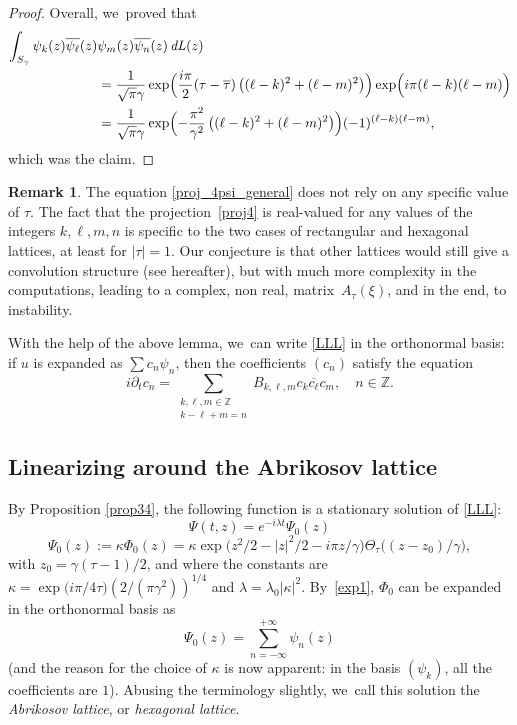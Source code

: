 \documentclass[10pt]{amsart}
\DeclareMathOperator{\dL}{\mathit{dL}}
\theoremstyle{definition}
\newtheorem{remark}[theorem]{Remark}
\let\EE\exp
\let\ov\overline
\newcommand\Z{\mathbb Z}
\newcommand{\pa}[1]{\left(#1\right)}
\begin{document}
\begin{proof}
Overall, we~proved that
\begin{align*}
\int_{S_{\gamma}} \psi_{k}(z)\ov{\psi_{\ell}}(z) &\psi_{m}(z)\ov{\psi_{n}}(z)\dL(z)\\
&= \frac{1}{\sqrt{\pi}\gamma} \EE\Bigl({ \frac{i\pi}{2}(\tau-\ov{\tau})\pa{(\ell-k)^2 + (\ell-m)^2}} \Bigr) \EE \Bigl({i\pi(\ell-k)(\ell-m)}\Bigr) \\
& = \frac{1}{\sqrt{\pi}\gamma} \EE\Bigl(-\frac{\pi^2}{\gamma^2}\pa{(\ell-k)^2 + (\ell-m)^2} \Bigr) (-1)^{(\ell-k)(\ell-m)},
\end{align*}
which was the claim.
\end{proof}

\begin{remark}\label{rk_tau_general}
The equation \eqref{proj_4psi_general} does not rely on any specific value of $\tau$. The fact that the projection~\eqref{proj4} is real-valued for any values of the integers $k, \ell, m,n$ is specific to the two cases of rectangular and hexagonal lattices, at least for $|\tau| = 1$. Our conjecture is that other lattices would still give a convolution structure (see hereafter), but with much more complexity in the computations, leading to a complex, non real, matrix~$A_\tau(\xi)$, and in the end, to instability.
\end{remark}

With the help of the above lemma, we~can write \eqref{LLL} in the orthonormal basis: if $u$ is expanded as $\sum c_n \psi_n$, then the coefficients $(c_n)$ satisfy the equation
\begin{equation}
\label{eqinck}
i \partial_t c_n = \sum_{\substack{k,\ell,m \in \mathbb{Z} \\ k - \ell + m = n}} B_{k,\ell,m} c_{k} \ov{c_{\ell}} c_{m}, \quad n \in \Z.
\end{equation}

\subsection{Linearizing around the Abrikosov lattice}

By Proposition \ref{prop34}, the following function is a stationary solution of \eqref{LLL}:
\begin{equation*}
\Psi(t,z) = e^{-i\lambda t}\Psi_0(z)
\end{equation*}
\begin{equation}\label{def1.1}
\Psi_0(z):= \kappa \Phi_0(z)= \kappa \EE\bigl({z^2/2-|z|^2/2-{i\pi z}/{\gamma}} \bigr)\Theta_\tau\bigl({ \pa{z-z_0}/\gamma}\bigr),
\end{equation}
with $z_0 = {\gamma}(\tau-1)/2$, and where the constants are $\kappa= \EE\bigl({i{\pi}/{4}\tau}\bigr) \pa{{2}/({\pi\gamma^2})}^{1/4}$ and $\lambda = \lambda_0 |\kappa|^2$. By~\eqref{exp1}, $\Phi_0$ can be expanded in the orthonormal basis as
\[
\Psi_0(z) = \sum_{n=-\infty}^{+\infty} \psi_n(z)
\]
(and the reason for the choice of $\kappa$ is now apparent: in the basis $(\psi_k)$, all the coefficients are $1$). Abusing the terminology slightly, we~call this solution the \emph{Abrikosov lattice}, or \emph{hexagonal lattice}.
\end{document}
